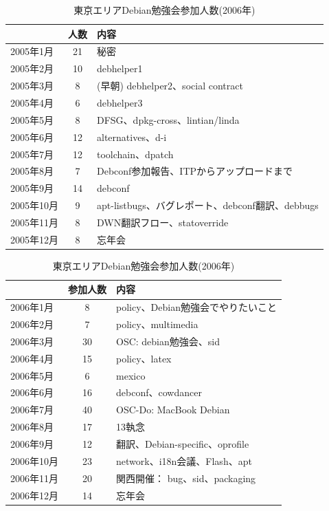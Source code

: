 \documentclass[mingoth,a4paper]{jsarticle}
\begin{document}
 \begin{table}[ht]
\begin{minipage}{0.5\hsize}
 \caption{東京エリアDebian勉強会参加人数(2005年)}\label{tab:count}
 \begin{center}
  \begin{tabular}{|l|c|p{10em}|}
 \hline
   & 人数 & 内容 \\
 \hline
   2005年1月 & 21 & 秘密\\
   2005年2月 & 10 & debhelper1\\
   2005年3月 & 8 &  (早朝) debhelper2、social contract\\
   2005年4月 & 6 & debhelper3\\
   2005年5月 & 8 & DFSG、dpkg-cross、lintian/linda\\
   2005年6月 & 12 & alternatives、d-i\\
   2005年7月 & 12 & toolchain、dpatch\\
   2005年8月 & 7 & Debconf参加報告、ITPからアップロードまで\\
   2005年9月 & 14 & debconf\\
   2005年10月 & 9 & apt-listbugs、バグレポート、debconf翻訳、debbugs\\
   2005年11月 & 8 & DWN翻訳フロー、statoverride\\
   2005年12月 & 8 & 忘年会\\
 \hline
  \end{tabular}
 \end{center}
\end{minipage}
\begin{minipage}{0.5\hsize}
 \caption{東京エリアDebian勉強会参加人数(2006年)}\label{tab:count2006}
 \begin{center}
  \begin{tabular}{|l|c|p{10em}|}
 \hline
 & 参加人数 & 内容\\
 \hline
 2006年1月 & 8 & policy、Debian勉強会でやりたいこと\\
 2006年2月 & 7 & policy、multimedia \\
 2006年3月 & 30 & OSC: debian勉強会、sid \\
 2006年4月 & 15 & policy、latex \\
 2006年5月 & 6 & mexico \\
 2006年6月 & 16 & debconf、cowdancer\\
 2006年7月 & 40 & OSC-Do: MacBook Debian \\
 2006年8月 & 17 & 13執念 \\
 2006年9月 & 12 & 翻訳、Debian-specific、oprofile \\
 2006年10月 & 23 & network、i18n会議、Flash、apt \\
 2006年11月 & 20 & 関西開催： bug、sid、packaging \\
 2006年12月 & 14 & 忘年会 \\
 \hline
  \end{tabular}
 \end{center}
\end{minipage}
 \end{table}
\end{document}

